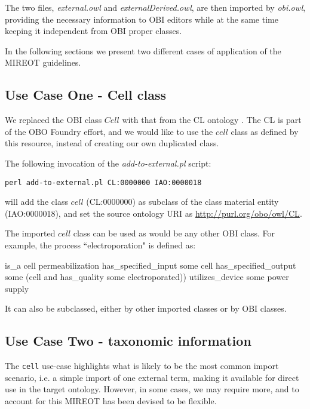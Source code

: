 \documentclass[a4paper,10pt,twocolumn]{article}
\begin{document}
The two files, \emph{external.owl} and \emph{externalDerived.owl}, are then imported by \emph{obi.owl}, providing the necessary information to OBI editors while at the same time keeping it independent from OBI proper classes.

In the following sections we present two different cases of application of the \ac{MIREOT} guidelines.


\subsection*{Use Case One - Cell class}

We replaced the \ac{OBI} class $Cell$ with that from the \ac{CL} ontology \cite{RefWorks:1559}. 
The \ac{CL} is part of the \ac{OBO} Foundry effort, and we would like to use the $cell$ class as defined by this resource, instead of creating our own duplicated class.

The following invocation of the \emph{add-to-external.pl} script:

\begin{footnotesize}
\begin{verbatim}
perl add-to-external.pl CL:0000000 IAO:0000018
\end{verbatim}
\end{footnotesize}

will add the class $cell$ (CL:0000000) as subclass of the class material entity (IAO:0000018), and set the source ontology URI as \url{http://purl.org/obo/owl/CL}.


The imported $cell$ class can be used as would be any other OBI class. For example, the process ``electroporation" is defined as:

\begin{footnotesize}
\begin{verbatimtab}
is_a cell permeabilization
has_specified_input some cell
has_specified_output some 
   (cell and has_quality some electroporated))
utilizes_device some power supply
\end{verbatimtab}
\end{footnotesize}

It can also be subclassed, either by other imported classes or by OBI classes.


\subsection*{Use Case Two - taxonomic information}

The \texttt{cell} use-case highlights what is likely to be the most common import scenario, i.e. a simple import of one external term, making it available for direct use in the target ontology.
However, in some cases, we may require more, and to account for this \ac{MIREOT} has been devised to be flexible.
\end{document}
